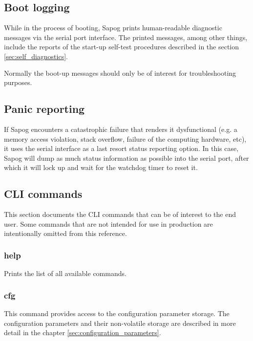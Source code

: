 \documentclass{zubaxdoc}
\begin{document}
\subsection{Boot logging}

While in the process of booting, Sapog prints human-readable diagnostic messages via the serial port interface.
The printed messages, among other things, include the reports of the start-up self-test procedures
described in the section \ref{sec:self_diagnostics}.

Normally the boot-up messages should only be of interest for troubleshooting purposes.

\subsection{Panic reporting}

If Sapog encounters a catastrophic failure that renders it dysfunctional
(e.g. a memory access violation, stack overflow, failure of the computing hardware, etc),
it uses the serial interface as a last resort status reporting option.
In this case, Sapog will dump as much status information as possible into the serial port,
after which it will lock up and wait for the watchdog timer to reset it.

\subsection{CLI commands}

This section documents the CLI commands that can be of interest to the end user.
Some commands that are not intended for use in production are intentionally omitted from this reference.

\subsubsection{help}

Prints the list of all available commands.

\subsubsection{cfg}

This command provides access to the configuration parameter storage.
The configuration parameters and their non-volatile storage are described in more detail in the chapter
\ref{sec:configuration_parameters}.
\end{document}
